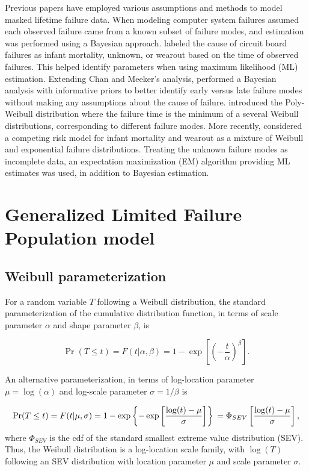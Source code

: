 \documentclass[12pt]{article}
\begin{document}
Previous papers have employed various assumptions and methods to model masked lifetime failure data.  When modeling computer system failures \citet{reiser} assumed each observed failure came from a known subset of failure modes, and estimation was performed using a Bayesian approach.  \cite{chan} labeled the cause of circuit board failures as infant mortality, unknown, or wearout based on the time of observed failures.  This helped identify parameters when using maximum likelihood (ML) estimation.  Extending Chan and Meeker's analysis, \citet{basu} performed a Bayesian analysis with informative priors to better identify early versus late failure modes without making any assumptions about the cause of failure.  \cite{berger} introduced the Poly-Weibull distribution where the failure time is the minimum of a several Weibull distributions, corresponding to different failure modes.  More recently, \cite{ranjan} considered a competing risk model for infant mortality and wearout as a mixture of Weibull and exponential failure distributions.  Treating the unknown failure modes as incomplete data, an expectation maximization (EM) algorithm providing ML estimates was used, in addition to Bayesian estimation.


\section{Generalized Limited Failure Population model}
\label{sec:GLFP model}

\subsection{Weibull parameterization}
\label{sec:Weibull parameterization}
For a random variable $T$ following a Weibull distribution, the standard parameterization of the cumulative distribution function, in terms of scale parameter $\alpha$ and shape parameter $\beta$, is

$$ \Pr(T \le t) = F(t|\alpha,\beta) = 1 - \exp \left[ \left( -\frac{t}{\alpha} \right)^\beta \right]. $$

An alternative parameterization, in terms of log-location parameter $\mu = \log (\alpha)$ and log-scale parameter $\sigma = 1/\beta$ is

\begin{equation} \Pr(T \le t) = F(t|\mu, \sigma) = 1 - \exp \left\{ -\exp \left[ \frac{ \log (t) - \mu }{\sigma} \right] \right\}\\
= \Phi_{SEV}\left[\frac{\log (t) - \mu}{\sigma}\right],
\end{equation}
where $\Phi_{SEV}$ is the cdf of the standard smallest extreme value distribution (SEV). Thus, the Weibull distribution is a log-location scale family, with $\log(T)$ following an SEV distribution with location parameter $\mu$ and scale parameter $\sigma$. 
\end{document}

